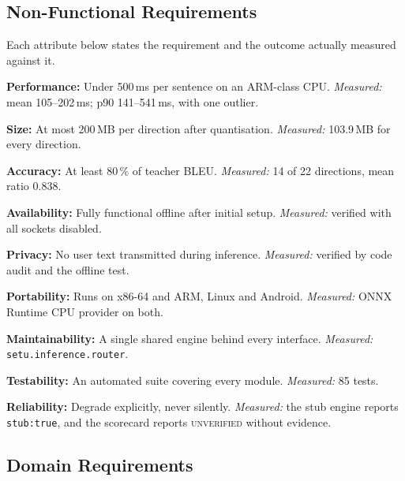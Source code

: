 \clearpage
\subsection{Non-Functional Requirements}
\label{subsec:nonfuncreq}

Each attribute below states the requirement and the outcome actually measured
against it.

\begin{bullets}
\item \textbf{Performance:} Under 500\,ms per sentence on an ARM-class CPU. \emph{Measured:} mean 105--202\,ms; p90 141--541\,ms, with one outlier.
\item \textbf{Size:} At most 200\,MB per direction after quantisation. \emph{Measured:} 103.9\,MB for every direction.
\item \textbf{Accuracy:} At least 80\,\% of teacher BLEU. \emph{Measured:} 14 of 22 directions, mean ratio 0.838.
\item \textbf{Availability:} Fully functional offline after initial setup. \emph{Measured:} verified with all sockets disabled.
\item \textbf{Privacy:} No user text transmitted during inference. \emph{Measured:} verified by code audit and the offline test.
\item \textbf{Portability:} Runs on x86-64 and ARM, Linux and Android. \emph{Measured:} ONNX Runtime CPU provider on both.
\item \textbf{Maintainability:} A single shared engine behind every interface. \emph{Measured:} \texttt{setu.inference.router}.
\item \textbf{Testability:} An automated suite covering every module. \emph{Measured:} 85 tests.
\item \textbf{Reliability:} Degrade explicitly, never silently. \emph{Measured:} the stub engine reports \texttt{stub:true}, and the scorecard reports \textsc{unverified} without evidence.
\end{bullets}

\subsection{Domain Requirements}
\label{subsec:domainreq}

